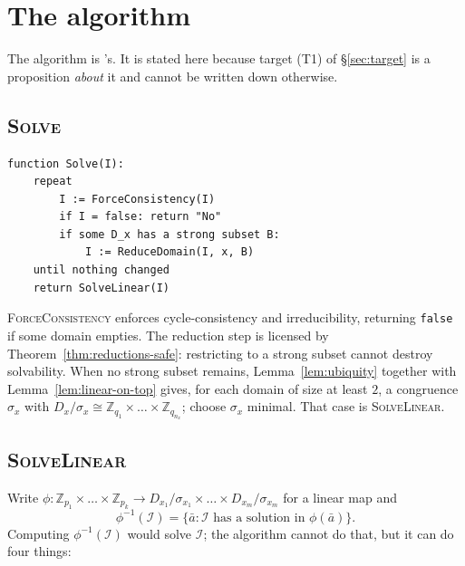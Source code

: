 \section{The algorithm}\label{sec:algorithm}

The algorithm is \cite{ZhukJACM}'s. It is stated here because target
\textup{(T1)} of \S\ref{sec:target} is a proposition \emph{about} it and
cannot be written down otherwise.

\subsection{\textsc{Solve}}

\begin{verbatim}
function Solve(I):
    repeat
        I := ForceConsistency(I)
        if I = false: return "No"
        if some D_x has a strong subset B:
            I := ReduceDomain(I, x, B)
    until nothing changed
    return SolveLinear(I)
\end{verbatim}

\textsc{ForceConsistency} enforces cycle-consistency and irreducibility,
returning \texttt{false} if some domain empties. The reduction step is licensed
by Theorem~\ref{thm:reductions-safe}: restricting to a strong subset cannot
destroy solvability. When no strong subset remains, Lemma~\ref{lem:ubiquity}
together with Lemma~\ref{lem:linear-on-top} gives, for each domain of size at
least $2$, a congruence $\sigma_{x}$ with $D_{x}/\sigma_{x}\cong\mathbb Z_{q_{1}}
\times\dots\times\mathbb Z_{q_{n_{x}}}$; choose $\sigma_{x}$ minimal. That case
is \textsc{SolveLinear}.

\subsection{\textsc{SolveLinear}}

Write $\phi\colon\mathbb Z_{p_{1}}\times\dots\times\mathbb Z_{p_{k}}\to
D_{x_{1}}/\sigma_{x_{1}}\times\dots\times D_{x_{m}}/\sigma_{x_{m}}$ for a linear
map and
\[
  \phi^{-1}(\mathcal I)=\{\bar a:\mathcal I\text{ has a solution in }\phi(\bar a)\}.
\]
Computing $\phi^{-1}(\mathcal I)$ would solve $\mathcal I$; the algorithm cannot
do that, but it can do four things:

